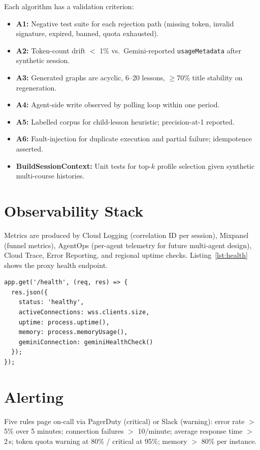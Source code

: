 Each algorithm has a validation criterion:
\begin{itemize}
    \item \textbf{A1:} Negative test suite for each rejection path (missing token, invalid signature, expired, banned, quota exhausted).
    \item \textbf{A2:} Token-count drift $<$ 1\% vs.\ Gemini-reported \texttt{usageMetadata} after synthetic session.
    \item \textbf{A3:} Generated graphs are acyclic, 6--20 lessons, $\geq$70\% title stability on regeneration.
    \item \textbf{A4:} Agent-side write observed by polling loop within one period.
    \item \textbf{A5:} Labelled corpus for child-lesson heuristic; precision-at-1 reported.
    \item \textbf{A6:} Fault-injection for duplicate execution and partial failure; idempotence asserted.
    \item \textbf{BuildSessionContext:} Unit tests for top-$k$ profile selection given synthetic multi-course histories.
\end{itemize}

\section{Observability Stack}
\label{sec:observability}

Metrics are produced by Cloud Logging (correlation ID per session), Mixpanel (funnel metrics), AgentOps (per-agent telemetry for future multi-agent design), Cloud Trace, Error Reporting, and regional uptime checks. Listing~\ref{lst:health} shows the proxy health endpoint.

\begin{lstlisting}[caption={Proxy health endpoint.},label=lst:health]
app.get('/health', (req, res) => {
  res.json({
    status: 'healthy',
    activeConnections: wss.clients.size,
    uptime: process.uptime(),
    memory: process.memoryUsage(),
    geminiConnection: geminiHealthCheck()
  });
});
\end{lstlisting}

\section{Alerting}
\label{sec:alerting}

Five rules page on-call via PagerDuty (critical) or Slack (warning): error rate $>$ 5\% over 5 minutes; connection failures $>$ 10/minute; average response time $>$ 2\,s; token quota warning at 80\% / critical at 95\%; memory $>$ 80\% per instance.

